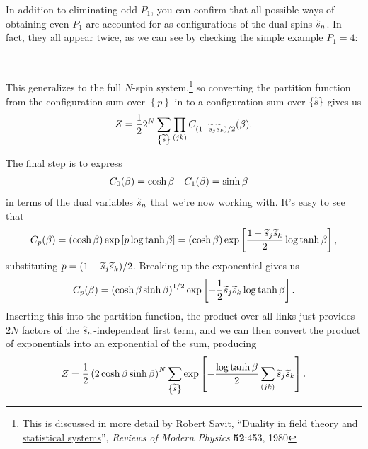 In addition to eliminating odd $P_1$, you can confirm that all possible ways of obtaining even $P_1$ are accounted for as configurations of the dual spins $\widetilde s_n$.
In fact, they all appear twice, as we can see by checking the simple example $P_1 = 4$: %
\begin{mdframed}
  \ \\[50 pt]
\end{mdframed}
This generalizes to the full $N$-spin system,\footnote{This is discussed in more detail by Robert Savit, ``\href{https://doi.org/10.1103/RevModPhys.52.453}{Duality in field theory and statistical systems}'', \textit{Reviews of Modern Physics} \textbf{52}:453, 1980} so converting the partition function from the configuration sum over $\left\{p\right\}$ in  to a configuration sum over $\left\{\widetilde s\right\}$ gives us
\begin{equation*}
  Z = \frac{1}{2} 2^N \sum_{\left\{\widetilde s\right\}} \prod_{(jk)} C_{(1 - \widetilde s_j \widetilde s_k) / 2}(\beta).
\end{equation*}

The final step is to express
\begin{align*}
  C_0(\beta) & = \cosh \beta &
  C_1(\beta) & = \sinh \beta
\end{align*}
in terms of the dual variables $\widetilde s_n$ that we're now working with.
It's easy to see that
\begin{equation*}
  C_p(\beta) = \left(\cosh \beta\right) \exp\left[p \log \tanh \beta\right] = \left(\cosh \beta\right) \exp\left[\frac{1 - \widetilde s_j \widetilde s_k}{2} \log \tanh \beta\right],
\end{equation*}
substituting $p = (1 - \widetilde s_j \widetilde s_k) / 2$.
Breaking up the exponential gives us
\begin{equation*}
  C_p(\beta) = \left(\cosh\beta \sinh\beta\right)^{1 / 2} \exp\left[-\frac{1}{2} \widetilde s_j \widetilde s_k \log \tanh \beta\right].
\end{equation*}
Inserting this into the partition function, the product over all links just provides $2N$ factors of the $\widetilde s_n$-independent first term, and we can then convert the product of exponentials into an exponential of the sum, producing
\begin{equation*}
  Z = \frac{1}{2} \left(2\cosh\beta \sinh\beta\right)^N \sum_{\left\{\widetilde s\right\}} \exp\left[-\frac{\log \tanh \beta}{2} \sum_{(jk)} \widetilde s_j \widetilde s_k\right].
\end{equation*}

